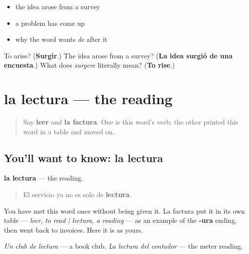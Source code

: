 \begin{itemize}
\raggedright
  \item the idea arose from a survey
  \item a problem has come up
  \item why the word wants \emph{de} after it
\end{itemize}

\begin{tcolorbox}[breakable,colback=teal!4,colframe=teal!35!black,title={Before you move on}]
To arise? (\textbf{Surgir}.) The idea arose from a survey? (\textbf{La idea surgió de una encuesta}.) What does \emph{surgere} literally mean? (\textbf{To rise}.)
\end{tcolorbox}
\section[la lectura]{la lectura — the reading}

\label{lesson:ES-C472-lectura}



\begin{quote}
Say \textbf{leer} and \textbf{la factura}. One is this word's verb; the other printed this word in a table and moved on.
\end{quote}

\subsection*{You'll want to know: la lectura}
\textbf{la lectura} — the reading.

\begin{quote}
El servicio ya no es solo de \textbf{lectura}.
\end{quote}

You have met this word once without being given it. La factura put it in its own table — \emph{leer, to read | lectura, a reading} — as an example of the \textbf{-ura} ending, then went back to invoices. Here it is as yours.

\emph{Un club de lectura} — a book club. \emph{La lectura del contador} — the meter reading.

